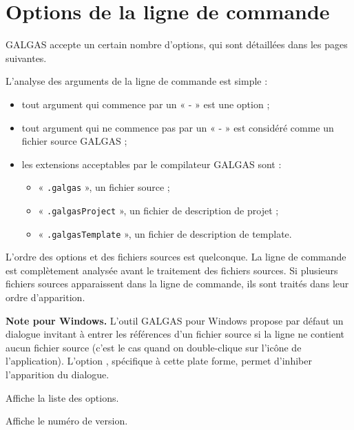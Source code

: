 
\chapter{Options de la ligne de commande}

GALGAS accepte un certain nombre d’options, qui sont détaillées dans les pages suivantes.

L’analyse des arguments de la ligne de commande est simple :
\begin{itemize}
  \item tout argument qui commence par un « - » est une option ;
  \item tout argument qui ne commence pas par un « - » est considéré comme un fichier source GALGAS ;
  \item les extensions acceptables par le compilateur GALGAS sont :
  \begin{itemize}
    \item « \texttt{.galgas} », un fichier source ;
    \item « \texttt{.galgasProject} », un fichier de description de projet ;
    \item « \texttt{.galgasTemplate} », un fichier de description de template.
  \end{itemize}
\end{itemize}

L’ordre des options et des fichiers sources est quelconque. La ligne de commande est complètement analysée avant le traitement des fichiers sources. Si plusieurs fichiers sources apparaissent dans la ligne de commande, ils sont traités dans leur ordre d’apparition.

{\bf Note pour Windows.} L’outil GALGAS pour Windows propose par défaut un dialogue invitant à entrer les références d’un fichier source si la ligne ne contient aucun fichier source (c’est le cas quand on double-clique sur l’icône de l’application). L'option , spécifique à cette plate forme, permet d'inhiber l’apparition du dialogue.


 Affiche la liste des options.

 Affiche le numéro de version.


